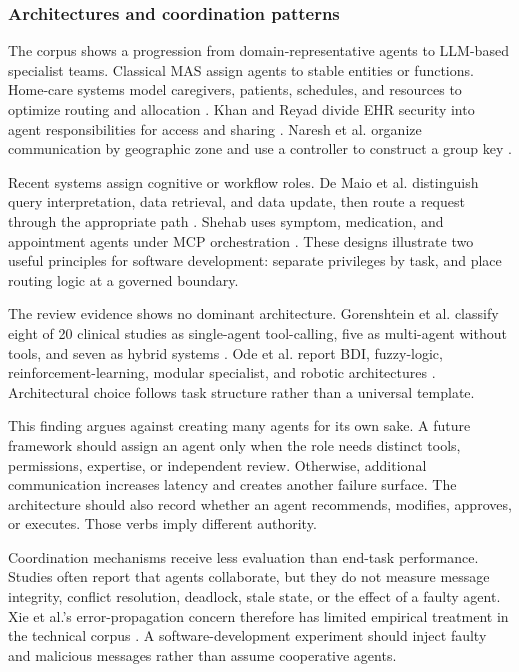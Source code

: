 \documentclass[11pt,a4paper]{article}
\begin{document}
\subsubsection{Architectures and coordination patterns}

The corpus shows a progression from domain-representative agents to LLM-based specialist teams. Classical MAS assign agents to stable entities or functions. Home-care systems model caregivers, patients, schedules, and resources to optimize routing and allocation \cite{becker2018survey}. Khan and Reyad divide EHR security into agent responsibilities for access and sharing \cite{khan2019ibac}. Naresh et al. organize communication by geographic zone and use a controller to construct a group key \cite{naresh2020quantum}.

Recent systems assign cognitive or workflow roles. De Maio et al. distinguish query interpretation, data retrieval, and data update, then route a request through the appropriate path \cite[pp.~3--6]{demaio2025privacy}. Shehab uses symptom, medication, and appointment agents under MCP orchestration \cite[pp.~2--4]{shehab2025agentic}. These designs illustrate two useful principles for software development: separate privileges by task, and place routing logic at a governed boundary.

The review evidence shows no dominant architecture. Gorenshtein et al. classify eight of 20 clinical studies as single-agent tool-calling, five as multi-agent without tools, and seven as hybrid systems \cite[pp.~10--12]{gorenshtein2025clinical}. Ode et al. report BDI, fuzzy-logic, reinforcement-learning, modular specialist, and robotic architectures \cite[pp.~3--6]{ode2025evidence}. Architectural choice follows task structure rather than a universal template.

This finding argues against creating many agents for its own sake. A future framework should assign an agent only when the role needs distinct tools, permissions, expertise, or independent review. Otherwise, additional communication increases latency and creates another failure surface. The architecture should also record whether an agent recommends, modifies, approves, or executes. Those verbs imply different authority.

Coordination mechanisms receive less evaluation than end-task performance. Studies often report that agents collaborate, but they do not measure message integrity, conflict resolution, deadlock, stale state, or the effect of a faulty agent. Xie et al.'s error-propagation concern therefore has limited empirical treatment in the technical corpus \cite[pp.~5--7]{xie2026ethical}. A software-development experiment should inject faulty and malicious messages rather than assume cooperative agents.
\end{document}
